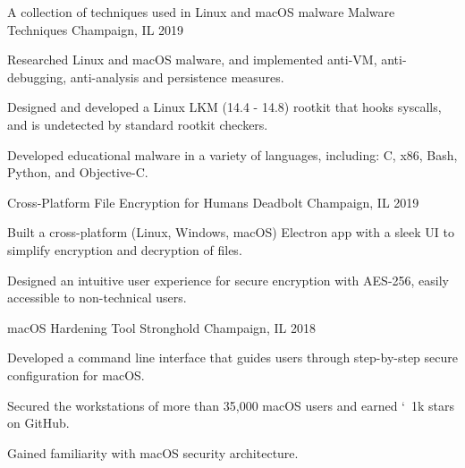 
\begin{cventries}
\cventry
{A collection of techniques used in Linux and macOS malware} %
{Malware Techniques} %
{Champaign, IL} %
{2019} %
{
	\begin{cvitems} %
		\item {Researched Linux and macOS malware, and implemented anti-VM, anti-debugging, anti-analysis and persistence measures.}
		\item {Designed and developed a Linux LKM (14.4 - 14.8) rootkit that hooks syscalls, and is undetected by standard rootkit checkers.}
		\item {Developed educational malware in a variety of languages, including: C, x86, Bash, Python, and Objective-C.}
	\end{cvitems}
}

\cventry
{Cross-Platform File Encryption for Humans} %
{Deadbolt} %
{Champaign, IL} %
{2019} %
{
	\begin{cvitems} %
		\item {Built a cross-platform (Linux, Windows, macOS) Electron app with a sleek UI to simplify encryption and decryption of files.}
		\item {Designed an intuitive user experience for secure encryption with AES-256, easily accessible to non-technical users.}
	\end{cvitems}
}

\cventry
{macOS Hardening Tool} %
{Stronghold} %
{Champaign, IL} %
{2018} %
{
	\begin{cvitems} %
		\item {Developed a command line interface that guides users through step-by-step secure configuration for macOS.}
		\item {Secured the workstations of more than 35,000 macOS users and earned \char`~1k stars on GitHub.}
		\item {Gained familiarity with macOS security architecture.}
	\end{cvitems}
}


\end{cventries}
